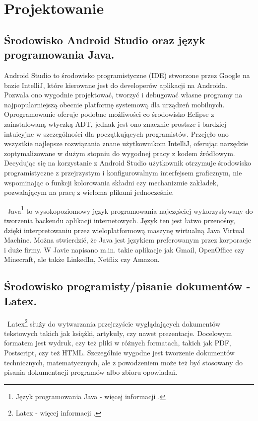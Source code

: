 \newpage
\section{Projektowanie}		%

\subsection{Środowisko Android Studio oraz język programowania Java.}
\hspace{0.60cm}Android Studio to środowisko programistyczne (IDE) stworzone przez Google na bazie IntelliJ, które kierowane jest do developerów aplikacji na Androida. Pozwala ono wygodnie projektować, tworzyć i debugować własne programy na najpopularniejszą obecnie platformę systemową dla urządzeń mobilnych. Oprogramowanie oferuje podobne możliwości co środowisko Eclipse z zainstalowaną wtyczką ADT, jednak jest ono znacznie prostsze i bardziej intuicyjne w szczególności dla początkujących programistów. Przejęło ono wszystkie najlepsze rozwiązania znane użytkownikom IntelliJ, oferując narzędzie zoptymalizowane w dużym stopniu do wygodnej pracy z kodem źródłowym. Decydując się na korzystanie z Android Studio użytkownik otrzymuje środowisko programistyczne z przejrzystym i konfigurowalnym interfejsem graficznym, nie wspominając o funkcji kolorowania składni czy mechanizmie zakładek, pozwalającym na pracę z wieloma plikami jednocześnie. \newline

~Java\footnote{Język programowania Java - więcej informacji \cite{www}.} to wysokopoziomowy język programowania najczęściej wykorzystywany do tworzenia backendu aplikacji internetowych. Język ten jest łatwo przenośny, dzięki interpretowaniu przez wieloplatformową maszynę wirtualną Java Virtual Machine. Można stwierdzić, że Java jest językiem preferowanym przez korporacje i duże firmy. W Javie napisano m.in. takie aplikacje jak Gmail, OpenOffice czy Minecraft, ale także LinkedIn, Netflix czy Amazon.

\newpage


\subsection{Środowisko programisty/pisanie dokumentów - Latex.}
\hspace{0.60cm}~Latex\footnote{Latex - więcej informacji \cite{www2}.} służy do wytwarzania przejrzyście wyglądających dokumentów tekstowych takich jak książki, artykuły, czy nawet prezentacje. Docelowym formatem jest wydruk, czy też pliki w różnych formatach, takich jak PDF, Postscript, czy też HTML. Szczególnie wygodne jest tworzenie dokumentów technicznych, matematycznych, ale z powodzeniem może też być stosowany do pisania dokumentacji programów albo zbioru opowiadań.\newline

